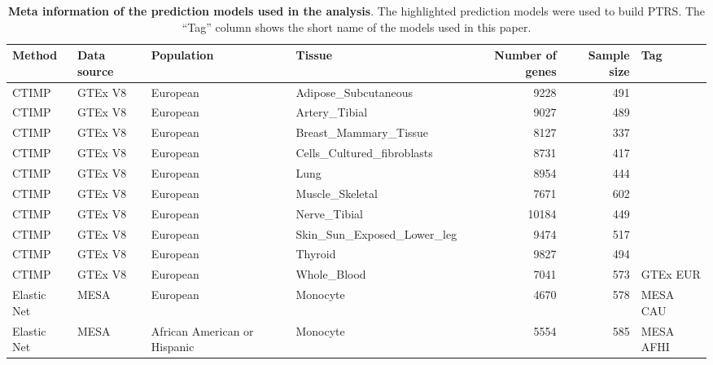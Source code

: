 \begin{table}[ht]
\centering
\begingroup\tiny
\begin{tabular}{llllrrl}
  \toprule
{\textbf{Method}} & {\textbf{Data source}} & {\textbf{Population}} & {\textbf{Tissue}} & {\textbf{Number of genes}} & {\textbf{Sample size}} & {\textbf{Tag}} \\ 
  \midrule
CTIMP & GTEx V8 & European & Adipose\_Subcutaneous &   9228 &    491 &  \\ 
  CTIMP & GTEx V8 & European & Artery\_Tibial &   9027 &    489 &  \\ 
  CTIMP & GTEx V8 & European & Breast\_Mammary\_Tissue &   8127 &    337 &  \\ 
  CTIMP & GTEx V8 & European & Cells\_Cultured\_fibroblasts &   8731 &    417 &  \\ 
  CTIMP & GTEx V8 & European & Lung &   8954 &    444 &  \\ 
  CTIMP & GTEx V8 & European & Muscle\_Skeletal &   7671 &    602 &  \\ 
  CTIMP & GTEx V8 & European & Nerve\_Tibial &  10184 &    449 &  \\ 
  CTIMP & GTEx V8 & European & Skin\_Sun\_Exposed\_Lower\_leg &   9474 &    517 &  \\ 
  CTIMP & GTEx V8 & European & Thyroid &   9827 &    494 &  \\ 
   \rowcolor{yellow}CTIMP & GTEx V8 & European & Whole\_Blood &   7041 &    573 & GTEx EUR \\ 
   \rowcolor{yellow}Elastic Net & MESA & European & Monocyte &   4670 &    578 & MESA CAU \\ 
   \rowcolor{yellow}Elastic Net & MESA & African American or Hispanic & Monocyte &   5554 &    585 & MESA AFHI \\ 
   \bottomrule
\end{tabular}
\endgroup
\caption{\textbf{Meta information of the prediction models used in the analysis}. The highlighted prediction models were used to build PTRS. The ``Tag'' column shows the short name of the models used in this paper.} 
\label{tab:prediction_model}
\end{table}

